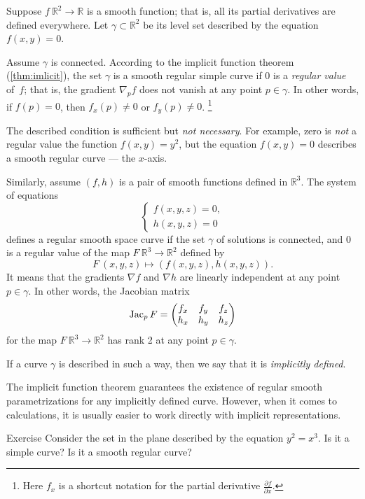Suppose $f\:\mathbb{R}^2\to \mathbb{R}$ is a smooth function; 
that is, all its partial derivatives are defined everywhere.
Let $\gamma\subset \mathbb{R}^2$ be its level set described by  the equation $f(x,y)=0$.

Assume $\gamma$ is connected.
According to the implicit function theorem (\ref{thm:imlicit}), the set $\gamma$ is a smooth regular simple curve if $0$ is a \emph{regular value} of~$f$; that is, the gradient $\nabla_p f$ does not vanish at any point $p\in \gamma$.
In other words, if $f(p)=0$, then   
$f_x(p)\ne 0$ or $f_y(p)\ne 0$.%
\footnote{Here $f_x$ is a shortcut notation for the partial derivative
$\tfrac{\partial f}{\partial x}$.}

The described condition is sufficient but {}\emph{not necessary}.
For example, zero is \emph{not} a regular value the function $f(x,y)=y^2$, but the equation $f(x,y)=0$ describes a smooth regular curve --- the $x$-axis.

Similarly, assume $(f,h)$ is a pair of smooth functions defined in $\mathbb{R}^3$.
The system of equations
\[\begin{cases}
   f(x,y,z)=0,
   \\
   h(x,y,z)=0
  \end{cases}
\]
defines a regular smooth space curve if the set $\gamma$ of solutions is connected, and $0$ is a regular value of the map $F\:\mathbb{R}^3\to\mathbb{R}^2$ defined by
\[F\:(x,y,z)\mapsto (f(x,y,z),h(x,y,z)).\]
It means that the gradients $\nabla f$ and $\nabla h$ are linearly independent at any point $p\in \gamma$.
In other words, the Jacobian matrix
\[
\mathop{\rm Jac}\nolimits_pF=\begin{pmatrix}
f_x&f_y&f_z\\
h_x&h_y&h_z
\end{pmatrix}
\]
for the map $F\:\mathbb{R}^3\to\mathbb{R}^2$ has rank 2 at any point $p \in \gamma$.

If a curve $\gamma$ is described in such a way,
then we say that it is \emph{implicitly defined}.

The implicit function theorem guarantees the existence of regular smooth parametrizations for any implicitly defined curve.
However, when it comes to calculations, it is usually easier to work directly with implicit representations. 

\begin{thm}{Exercise}\label{ex:y^2=x^3}
Consider the set in the plane described by the equation
$y^2=x^3$.
Is it a simple curve?
Is it a smooth regular curve?
\end{thm}


